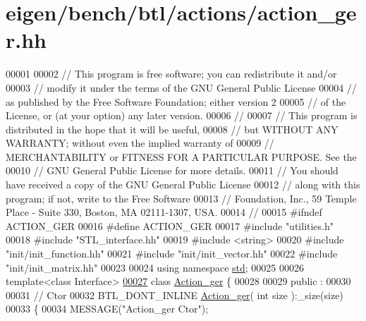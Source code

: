 \hypertarget{eigen_2bench_2btl_2actions_2action__ger_8hh_source}{}\section{eigen/bench/btl/actions/action\+\_\+ger.hh}
\label{eigen_2bench_2btl_2actions_2action__ger_8hh_source}

\begin{DoxyCode}
00001 
00002 \textcolor{comment}{// This program is free software; you can redistribute it and/or}
00003 \textcolor{comment}{// modify it under the terms of the GNU General Public License}
00004 \textcolor{comment}{// as published by the Free Software Foundation; either version 2}
00005 \textcolor{comment}{// of the License, or (at your option) any later version.}
00006 \textcolor{comment}{//}
00007 \textcolor{comment}{// This program is distributed in the hope that it will be useful,}
00008 \textcolor{comment}{// but WITHOUT ANY WARRANTY; without even the implied warranty of}
00009 \textcolor{comment}{// MERCHANTABILITY or FITNESS FOR A PARTICULAR PURPOSE.  See the}
00010 \textcolor{comment}{// GNU General Public License for more details.}
00011 \textcolor{comment}{// You should have received a copy of the GNU General Public License}
00012 \textcolor{comment}{// along with this program; if not, write to the Free Software}
00013 \textcolor{comment}{// Foundation, Inc., 59 Temple Place - Suite 330, Boston, MA  02111-1307, USA.}
00014 \textcolor{comment}{//}
00015 \textcolor{preprocessor}{#ifndef ACTION\_GER}
00016 \textcolor{preprocessor}{#define ACTION\_GER}
00017 \textcolor{preprocessor}{#include "utilities.h"}
00018 \textcolor{preprocessor}{#include "STL\_interface.hh"}
00019 \textcolor{preprocessor}{#include <string>}
00020 \textcolor{preprocessor}{#include "init/init\_function.hh"}
00021 \textcolor{preprocessor}{#include "init/init\_vector.hh"}
00022 \textcolor{preprocessor}{#include "init/init\_matrix.hh"}
00023 
00024 \textcolor{keyword}{using namespace }\hyperlink{namespacestd}{std};
00025 
00026 \textcolor{keyword}{template}<\textcolor{keyword}{class} Interface>
\hyperlink{class_action__ger}{00027} \textcolor{keyword}{class }\hyperlink{class_action__ger}{Action\_ger} \{
00028 
00029 public :
00030 
00031   \textcolor{comment}{// Ctor}
00032   BTL\_DONT\_INLINE \hyperlink{class_action__ger}{Action\_ger}( \textcolor{keywordtype}{int} size ):\_size(size)
00033   \{
00034     MESSAGE(\textcolor{stringliteral}{"Action\_ger Ctor"});

\end{DoxyCode}
